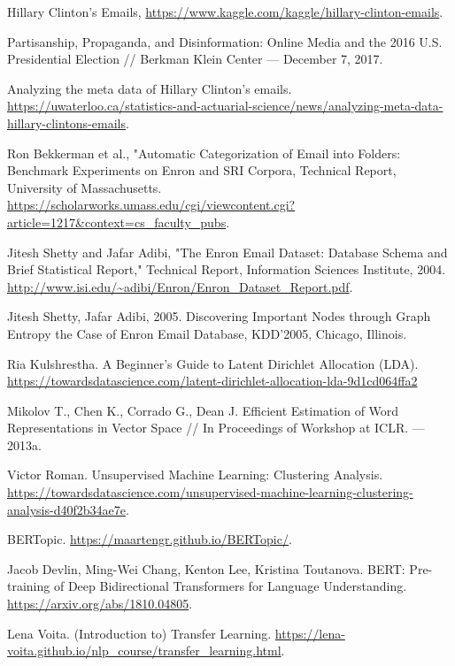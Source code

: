 

\begin{thebibliography}{3}

Hillary Clinton's Emails,
\url{https://www.kaggle.com/kaggle/hillary-clinton-emails}.

Partisanship, Propaganda, and Disinformation: Online Media and the 2016 U.S. Presidential Election // Berkman Klein Center — December 7, 2017.

Analyzing the meta data of Hillary Clinton’s emails.
\url{https://uwaterloo.ca/statistics-and-actuarial-science/news/analyzing-meta-data-hillary-clintons-emails}.

Ron Bekkerman et al., "Automatic Categorization of Email into Folders:
Benchmark Experiments on Enron and SRI Corpora, Technical Report,
University of Massachusetts. 
\url{https://scholarworks.umass.edu/cgi/viewcontent.cgi?article=1217&context=cs_faculty_pubs}.

Jitesh Shetty and Jafar Adibi, "The Enron Email Dataset: Database Schema and Brief Statistical Report," Technical Report, Information Sciences Institute, 2004. \url{http://www.isi.edu/~adibi/Enron/Enron_Dataset_Report.pdf}.

Jitesh Shetty, Jafar Adibi, 2005. Discovering Important Nodes
through Graph Entropy the Case of Enron Email Database,
KDD’2005, Chicago, Illinois.

Ria Kulshrestha. A Beginner’s Guide to Latent Dirichlet Allocation (LDA). \url{https://towardsdatascience.com/latent-dirichlet-allocation-lda-9d1cd064ffa2}

Mikolov T., Chen K., Corrado G., Dean J. Efficient Estimation of Word Representations in Vector Space // In Proceedings of Workshop at ICLR. — 2013a.

Victor Roman. Unsupervised Machine Learning: Clustering Analysis. \url{https://towardsdatascience.com/unsupervised-machine-learning-clustering-analysis-d40f2b34ae7e}.

BERTopic. \url{https://maartengr.github.io/BERTopic/}.

Jacob Devlin, Ming-Wei Chang, Kenton Lee, Kristina Toutanova. BERT: Pre-training of Deep Bidirectional Transformers for Language Understanding. 
\url{https://arxiv.org/abs/1810.04805}.

Lena Voita. 
(Introduction to) Transfer Learning. \url{https://lena-voita.github.io/nlp_course/transfer_learning.html}.


\end{thebibliography}
